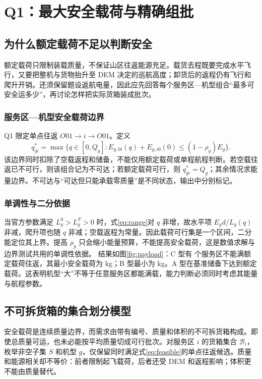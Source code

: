 \section{Q1：最大安全载荷与精确组批}\label{sec:q1}
\subsection{为什么额定载荷不足以判断安全}
额定载荷只限制装载质量，不保证山区往返能源充足。载货去程既要完成水平飞行，又要把整机与货物抬升至 DEM 决定的巡航高度；卸货后的返程仍有飞行和爬升开销。还须保留题设返航电量，因此应先回答每个服务区—机型组合“最多可安全运多少”，再讨论怎样把实际货箱装成批次。

\subsubsection{服务区—机型安全载荷边界}
Q1 限定单点往返 $O01\to i\to O01$。定义
\begin{equation}
q^*_{gi}=\max\{q\in[0,Q_g]:
E_{g,0i}(q)+E_{g,i0}(0)\le(1-\rho_g)E_g\}.\label{eq:qmax}
\end{equation}
该边界同时扣除了空载返程和储备，不能仅用额定载荷或单程航程判断。若空载往返已不可行，则该组合记为不可达；若额定载荷可行，则 $q^*_{gi}=Q_g$；其余情况求能量边界。不可达与“可达但只能承载零质量”是不同状态，输出中分别标记。

\subsubsection{单调性与二分依据}
当官方参数满足 $L_g^0>L_g^F>0$ 时，式\eqref{eq:range}对 $q$ 非增，故水平项 $E_gd/L_g(q)$ 非减，爬升项也随 $q$ 非减；空载返程为常量。因此载荷可行集是一个区间，二分能定位其上界。提高 $\rho_g$ 只会缩小能量预算，不能提高安全载荷，这是数值求解与边界测试共用的单调性依据。
结果如图\ref{fig:payload}：C 型有 \CRestricted{} 个服务区不能满额定载荷往返，其最小安全载荷为 \CMinPayload{} kg；B 型最小为 \BMinPayload{} kg。A 型在基准储备下达到额定载荷。这表明机型“大”不等于任意服务区都能满载，能力判断必须同时考虑其能量与航程参数。

\subsection{不可拆货箱的集合划分模型}
安全载荷是连续质量边界，而需求由带有编号、质量和体积的不可拆货箱构成。即使总质量可运，也未必能按平均质量切成可行批次。对服务区 $i$ 的货箱集合 $\mathcal B_i$，枚举非空子集 $S$ 和机型 $g$，仅保留同时满足式\eqref{eq:feasible}的单点往返候选。质量和能源相关却不等价：前者限制起飞载荷，后者还受 DEM 和返程影响；体积更不能由质量替代。

